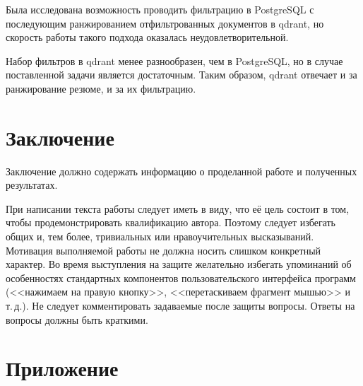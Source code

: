 \documentclass[14pt]{mmcs_article}
\begin{document}
Была исследована возможность проводить фильтрацию в PostgreSQL с последующим ранжированием отфильтрованных документов в qdrant, но скорость работы такого подхода оказалась неудовлетворительной.

Набор фильтров в qdrant менее разнообразен, чем в PostgreSQL, но в случае поставленной задачи является достаточным. Таким образом, qdrant отвечает и за ранжирование резюме, и за их фильтрацию.



\newpage
{}
\section*{Заключение}

Заключение должно содержать информацию о проделанной работе и полученных результатах.

При написании текста работы следует иметь в виду, что её цель состоит в том, чтобы продемонстрировать квалификацию автора. Поэтому следует избегать общих и, тем более, тривиальных или нравоучительных высказываний. Мотивация выполняемой работы не должна носить слишком конкретный характер. Во время выступления на защите желательно избегать упоминаний об особенностях стандартных компонентов пользовательского интерфейса программ (<<нажимаем на правую кнопку>>, <<перетаскиваем фрагмент мышью>> и т.\,д.). Не следует комментировать задаваемые после защиты вопросы. Ответы на вопросы должны быть краткими.



\newpage

\renewcommand{\refname}{\centering \textbf{Литература}}




\newpage
\section*{Приложение}
\end{document}
